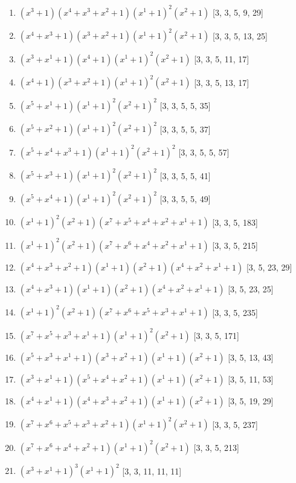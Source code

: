 \documentclass[10pt,twocolumn]{article}
\begin{document}
\begin{enumerate}
\item $(x^{3} + 1)(x^{4} + x^{3} + x^{2} + 1)(x^{1} + 1)^{2}(x^{2} + 1)$  [3, 3, 5, 9, 29]
\item $(x^{4} + x^{3} + 1)(x^{3} + x^{2} + 1)(x^{1} + 1)^{2}(x^{2} + 1)$  [3, 3, 5, 13, 25]
\item $(x^{3} + x^{1} + 1)(x^{4} + 1)(x^{1} + 1)^{2}(x^{2} + 1)$  [3, 3, 5, 11, 17]
\item $(x^{4} + 1)(x^{3} + x^{2} + 1)(x^{1} + 1)^{2}(x^{2} + 1)$  [3, 3, 5, 13, 17]
\item $(x^{5} + x^{1} + 1)(x^{1} + 1)^{2}(x^{2} + 1)^{2}$  [3, 3, 5, 5, 35]
\item $(x^{5} + x^{2} + 1)(x^{1} + 1)^{2}(x^{2} + 1)^{2}$  [3, 3, 5, 5, 37]
\item $(x^{5} + x^{4} + x^{3} + 1)(x^{1} + 1)^{2}(x^{2} + 1)^{2}$  [3, 3, 5, 5, 57]
\item $(x^{5} + x^{3} + 1)(x^{1} + 1)^{2}(x^{2} + 1)^{2}$  [3, 3, 5, 5, 41]
\item $(x^{5} + x^{4} + 1)(x^{1} + 1)^{2}(x^{2} + 1)^{2}$  [3, 3, 5, 5, 49]
\item $(x^{1} + 1)^{2}(x^{2} + 1)(x^{7} + x^{5} + x^{4} + x^{2} + x^{1} + 1)$  [3, 3, 5, 183]
\item $(x^{1} + 1)^{2}(x^{2} + 1)(x^{7} + x^{6} + x^{4} + x^{2} + x^{1} + 1)$  [3, 3, 5, 215]
\item $(x^{4} + x^{3} + x^{2} + 1)(x^{1} + 1)(x^{2} + 1)(x^{4} + x^{2} + x^{1} + 1)$  [3, 5, 23, 29]
\item $(x^{4} + x^{3} + 1)(x^{1} + 1)(x^{2} + 1)(x^{4} + x^{2} + x^{1} + 1)$  [3, 5, 23, 25]
\item $(x^{1} + 1)^{2}(x^{2} + 1)(x^{7} + x^{6} + x^{5} + x^{3} + x^{1} + 1)$  [3, 3, 5, 235]
\item $(x^{7} + x^{5} + x^{3} + x^{1} + 1)(x^{1} + 1)^{2}(x^{2} + 1)$  [3, 3, 5, 171]
\item $(x^{5} + x^{3} + x^{1} + 1)(x^{3} + x^{2} + 1)(x^{1} + 1)(x^{2} + 1)$  [3, 5, 13, 43]
\item $(x^{3} + x^{1} + 1)(x^{5} + x^{4} + x^{2} + 1)(x^{1} + 1)(x^{2} + 1)$  [3, 5, 11, 53]
\item $(x^{4} + x^{1} + 1)(x^{4} + x^{3} + x^{2} + 1)(x^{1} + 1)(x^{2} + 1)$  [3, 5, 19, 29]
\item $(x^{7} + x^{6} + x^{5} + x^{3} + x^{2} + 1)(x^{1} + 1)^{2}(x^{2} + 1)$  [3, 3, 5, 237]
\item $(x^{7} + x^{6} + x^{4} + x^{2} + 1)(x^{1} + 1)^{2}(x^{2} + 1)$  [3, 3, 5, 213]
\item $(x^{3} + x^{1} + 1)^{3}(x^{1} + 1)^{2}$  [3, 3, 11, 11, 11]

\end{enumerate}
\end{document}
